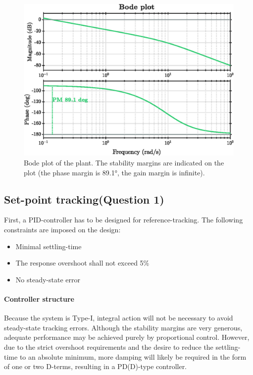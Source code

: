 \begin{figure}[ht]
    \centering
    \includegraphics[]{media/q1/cont_plant_bode.eps}
    \caption{Bode plot of the plant. The stability margins are indicated on the plot (the phase margin is \ang{89.1}, the gain margin is infinite).}
    \label{fig:cont_plant_bode}
\end{figure}

\subsection{Set-point tracking\textnormal{\phantom{xxx}(Question 1)}}
\label{sec:continuoustracking}
First, a PID-controller has to be designed for reference-tracking. The following constraints are imposed on the design:
\begin{itemize}
    \item Minimal settling-time
    \item The response overshoot shall not exceed 5\%
    \item No steady-state error
\end{itemize}

\paragraph{Controller structure}
Because the system is Type-I, integral action will not be necessary to avoid steady-state tracking errors. Although the stability margins are very generous, adequate performance may be achieved purely by proportional control. However, due to the strict overshoot requirements and the desire to reduce the settling-time to an absolute minimum, more damping will likely be required in the form of one or two D-terms, resulting in a PD(D)-type controller.


